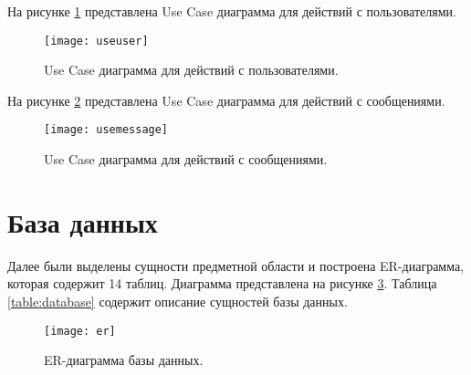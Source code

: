 На рисунке \ref{img:useuser} представлена Use Case диаграмма для действий с пользователями. 

\begin{figure}[H]
	\centering
	\texttt{[image: useuser]}
	\caption{Use Case диаграмма для действий с пользователями. }
	\label{img:useuser}
\end{figure}

На рисунке \ref{img:usemessage} представлена Use Case диаграмма для действий с сообщениями. 

\begin{figure}[H]
	\centering
	\texttt{[image: usemessage]}
	\caption{Use Case диаграмма для действий с сообщениями. }
	\label{img:usemessage}
\end{figure}


\section{\textbf{База данных}}

\hfill

Далее были выделены сущности предметной области и построена ER-диаграмма, которая содержит 14 таблиц. Диаграмма представлена на рисунке \ref{img:er}. Таблица \ref{table:database} содержит описание сущностей базы данных. 

\begin{figure}[H]
	\centering
	\texttt{[image: er]}
	\caption{ER-диаграмма базы данных. }
	\label{img:er}
\end{figure}

